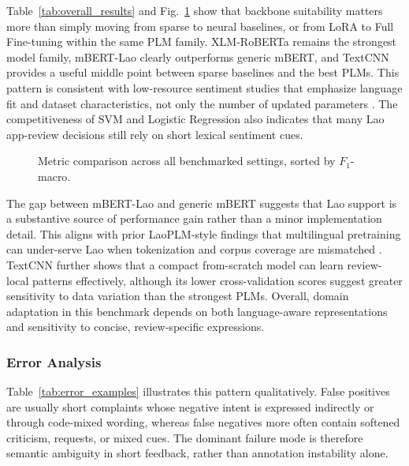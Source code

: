 \documentclass[conference, onecolumn]{IEEEtran}
\begin{document}
Table~\ref{tab:overall_results} and Fig.~\ref{fig:metric_overview} show that backbone suitability matters more than simply moving from sparse to neural baselines, or from LoRA to Full Fine-tuning within the same PLM family. XLM-RoBERTa remains the strongest model family, mBERT-Lao clearly outperforms generic mBERT, and TextCNN provides a useful middle point between sparse baselines and the best PLMs. This pattern is consistent with low-resource sentiment studies that emphasize language fit and dataset characteristics, not only the number of updated parameters \cite{lamin2025cross,subramanian2025kec_tech_titans,chowdhury2025mysticciol}. The competitiveness of SVM and Logistic Regression also indicates that many Lao app-review decisions still rely on short lexical sentiment cues.


\begin{figure}[!htbp]
\centering

\caption{Metric comparison across all benchmarked settings, sorted by $F_1$-macro.}
\label{fig:metric_overview}
\end{figure}

The gap between mBERT-Lao and generic mBERT suggests that Lao support is a substantive source of performance gain rather than a minor implementation detail. This aligns with prior LaoPLM-style findings that multilingual pretraining can under-serve Lao when tokenization and corpus coverage are mismatched \cite{lin2022laoplm,lamin2025cross}. TextCNN further shows that a compact from-scratch model can learn review-local patterns effectively, although its lower cross-validation scores suggest greater sensitivity to data variation than the strongest PLMs. Overall, domain adaptation in this benchmark depends on both language-aware representations and sensitivity to concise, review-specific expressions.

\subsubsection{Error Analysis}

Table~\ref{tab:error_examples} illustrates this pattern qualitatively. False positives are usually short complaints whose negative intent is expressed indirectly or through code-mixed wording, whereas false negatives more often contain softened criticism, requests, or mixed cues. The dominant failure mode is therefore semantic ambiguity in short feedback, rather than annotation instability alone.
\end{document}
